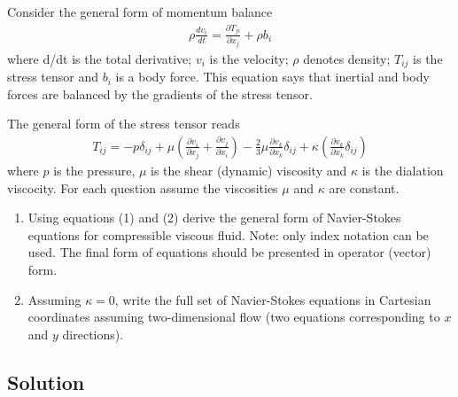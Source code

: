 \section{}
Consider the general form of momentum balance
\begin{align}
    \rho \frac{dv_i}{dt} = \frac{\partial T_{ji}}{\partial x_j} + \rho b_i \label{eq:1}
\end{align}
where d/dt is the total derivative; $v_i$ is the velocity; 
$\rho$ denotes density; $T_{ij}$ is the stress tensor and $b_i$ is a body force. 
This equation says that inertial and body forces are balanced by the gradients of the stress tensor.

The general form of the stress tensor reads
\begin{align}
    T_{ij} = -p \delta_{ij} + \mu \left(\frac{\partial v_i}{\partial x_j} + 
    \frac{\partial v_j}{\partial x_i} \right) - \frac{2}{3} \mu 
    \frac{\partial v_k}{\partial x_k} \delta_{ij} + \kappa \left(
    \frac{\partial v_k}{\partial x_k} \delta_{ij} \right) \label{eq:2}
\end{align}
where $p$ is the pressure, $\mu$ is the shear (dynamic) viscosity and $\kappa$ is the 
dialation viscocity. For each question assume the viscosities $\mu$ and $\kappa$ are constant.

\begin{enumerate}[label=(\alph*)]
    \item Using equations (1) and (2) derive the general form of Navier-Stokes equations for
    compressible viscous fluid. Note: only index notation can be used. The final form of
    equations should be presented in operator (vector) form.
    \item Assuming $\kappa = 0$, write the full set of Navier-Stokes equations
    in Cartesian coordinates assuming two-dimensional flow (two equations corresponding to $x$ and $y$
    directions).
\end{enumerate}

\subsection*{Solution}

